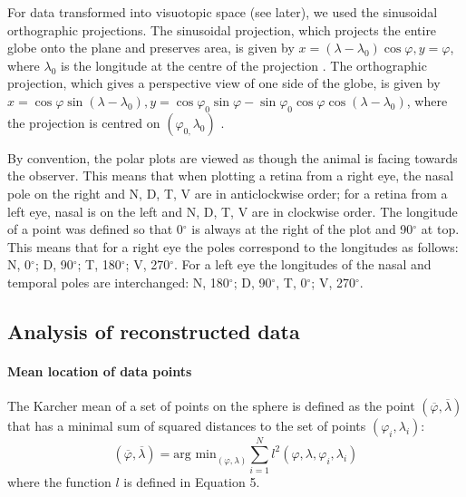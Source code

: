 \documentclass[10pt]{article}
\begin{document}
For data transformed into visuotopic space (see later), we used the
sinusoidal orthographic projections. The sinusoidal projection, which
projects the entire globe onto the plane and preserves area, is given
by  $x=(\lambda -\lambda _0)\cos \varphi ,y=\varphi $, where 
$\lambda _0$ is the longitude at the centre of the projection \cite{WolframSinusoidal2012}. The orthographic projection, which gives a
perspective view of one side of the globe, is given by 
$x=\cos \varphi \sin (\lambda -\lambda
_0),y=\cos \varphi _0\sin \varphi -\sin \varphi
_0\cos \varphi \cos (\lambda -\lambda _0)$, where  the
projection is centred on   $(\varphi _{0,}\lambda _0)$ \cite{WolframOrthographic2012}.

By convention, the polar plots are viewed as though the animal is
facing towards the observer. This means that when plotting a retina
from a right eye, the nasal pole on the right and N, D, T, V are in
anticlockwise order; for a retina from a left eye, nasal is on the
left and N, D, T, V are in clockwise order. The longitude of a point
was defined so that 0$^{\circ}$ is always at the right of the plot and
90$^{\circ}$ at top. This means that for a right eye the poles correspond
to the longitudes as follows: N, 0$^{\circ}$; D, 90$^{\circ}$; T, 180$^{\circ}$;
V, 270$^{\circ}$. For a left eye the longitudes of the nasal and temporal
poles are interchanged: N, 180$^{\circ}$; D, 90$^{\circ}$, T, 0$^{\circ}$; V,
270$^{\circ}$.

\subsection*{Analysis of reconstructed
data}
\paragraph{Mean location of data points}
The Karcher mean of a set of points on the sphere \cite{Karcher1977,HeoSmall2006} is defined as the point  $(\overline{\varphi
},\overline{\lambda })$ that has a minimal sum of squared distances
to the set of points  $(\varphi _i,\lambda _i)$:
\begin{equation}
(\overline{\varphi },\overline{\lambda })=\text{arg min}_{(\varphi
,\lambda )}\sum _{i=1}^Nl^2(\varphi ,\lambda ,\varphi _i,\lambda _i)
\end{equation}
where the function  $l$ is defined in Equation 5. 
\end{document}
